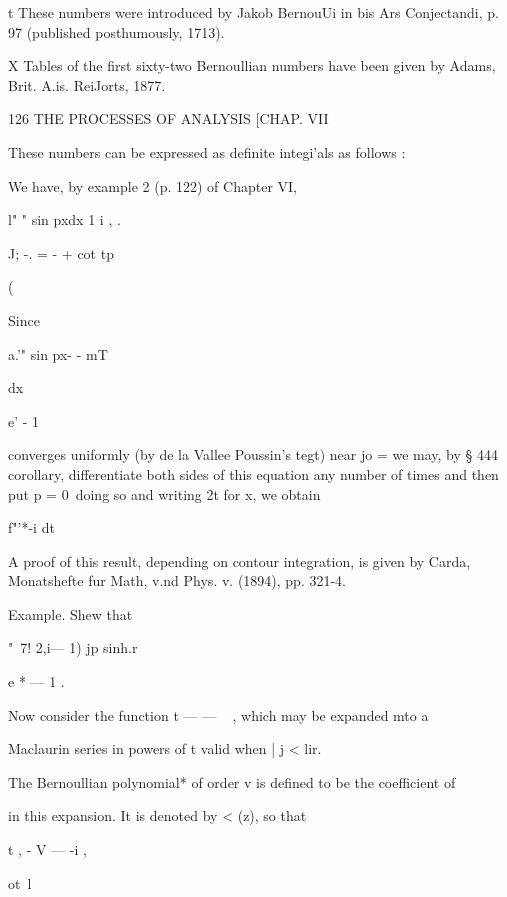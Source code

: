 t These numbers were introduced by Jakob BernouUi in bis Ars Conjectandi, p. 97 (published 
posthumously, 1713). 

X Tables of the first sixty-two Bernoullian numbers have been given by Adams, Brit. A.is. 
ReiJorts, 1877. 



126 THE PROCESSES OF ANALYSIS [CHAP. VII 

These numbers can be expressed as definite integi'als as follows : 

We have, by example 2 (p. 122) of Chapter VI, 

l" "  sin pxdx 1 i , . 

J; -. = -   +   cot tp 



( 



Since 



a.'" sin  px- - mT\ 

dx 

e'  - 1 



converges uniformly (by de la Vallee Poussin's tegt) near jo = we may, by 
§ 444 corollary, differentiate both sides of this equation any number of 
times and then put p = 0\ doing so and writing 2t for x, we obtain 



f"'*-i dt 






A proof of this result, depending on contour integration, is given by Carda, Monatshefte 
fur Math, v.nd Phys. v. (1894), pp. 321-4. 

Example. Shew that 

"~7! 2,i— 1) jp sinh.r     

e * — 1 . 

Now consider the function t —  — ~ , which may be expanded mto a 

Maclaurin series in powers of t valid when |   j < lir. 

The Bernoullian polynomial* of order v is defined to be the coefficient of 



in this expansion. It is denoted by <   (z), so that 

t , - V — -i , 



ot\ l 



